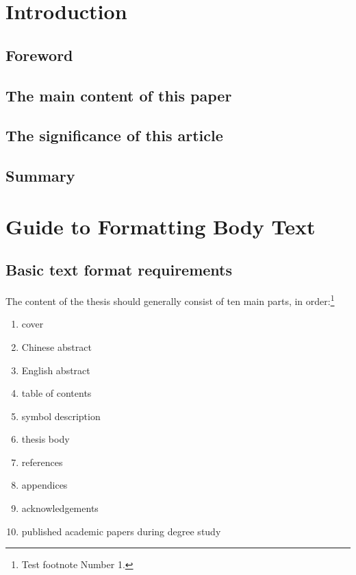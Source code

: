 \chapter{Introduction}

\section{Foreword}

\lipsum[1]

\section{The main content of this paper}

\lipsum[2]

\section{The significance of this article}

\lipsum[3]

\section{Summary}

\lipsum[4]


\chapter{Guide to Formatting Body Text}

\section{Basic text format requirements}

The content of the thesis should generally consist of ten main parts, in order:\footnote[1]{Test footnote Number 1.}
\begin{enumerate}
  \item cover
  \item Chinese abstract
  \item English abstract
  \item table of contents
  \item symbol description
  \item thesis body
  \item references
  \item appendices
  \item acknowledgements
  \item published academic papers during degree study
\end{enumerate}

